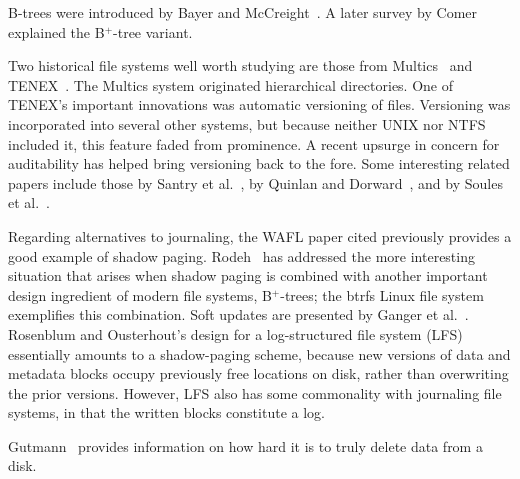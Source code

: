 B-trees were introduced by Bayer and McCreight~\cite{max1114}.  A
later survey by Comer~\cite{max1049} explained the B${}^+$-tree variant.

Two historical file systems well worth studying are those from
Multics~\cite{max1092} and TENEX~\cite{max1032}.  The Multics system
originated hierarchical directories.  One of TENEX's important
innovations was automatic versioning of files.  Versioning was
incorporated into several other systems, but because neither UNIX nor
NTFS included it, this feature faded from prominence.  A recent
upsurge in concern for auditability has helped bring versioning back
to the fore.  Some interesting related papers include those by
Santry et al.~\cite{max1139}, by Quinlan and
Dorward~\cite{max1140}, and by Soules et al.~\cite{max1141}.

Regarding alternatives to journaling, the WAFL paper cited previously
provides a good example of shadow paging.
Rodeh~\cite{max1199} has addressed the more interesting situation that arises when shadow paging is combined
with another important design ingredient of modern file systems, B$^+$-trees;
the btrfs Linux file system exemplifies this combination.
Soft updates are presented
by Ganger et al.~\cite{max1109}.  Rosenblum and Ousterhout's
design for a log-structured file system
(LFS)~\cite{max1107} essentially amounts to a shadow-paging scheme, because
new versions of data and metadata blocks occupy previously free locations
on disk, rather than overwriting the prior versions.  However, LFS
also has some commonality with journaling file systems, in that the
written blocks constitute a log.

Gutmann~\cite{max1136} provides information on how hard it is to truly
delete data from a disk.

